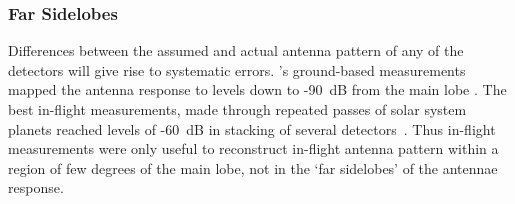 \documentclass[PICOReport.tex]{subfiles}
\begin{document}




\subsubsection{Far Sidelobes}
\label{sec:fsl}

Differences between the assumed and actual antenna pattern of any of the detectors will give rise to systematic errors. \planck 's ground-based measurements mapped the antenna response to levels down to -90~dB from the main lobe . The best in-flight measurements, made through repeated passes of solar system planets reached levels of -60~dB in stacking of several detectors~\citep{tauber2018}. Thus in-flight measurements were only useful to reconstruct in-flight antenna pattern within a region of few degrees of the main lobe, not in the `far sidelobes' of the antennae response.  
\end{document}
